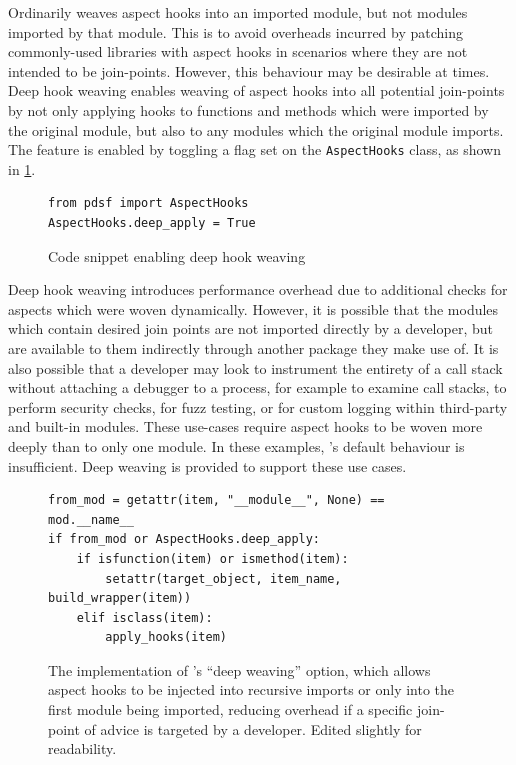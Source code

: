 Ordinarily \pdsf weaves aspect hooks into an imported module, but not modules
imported by that module. This is to avoid overheads incurred by patching
commonly-used libraries with aspect hooks in scenarios where they are not
intended to be join-points. However, this behaviour may be desirable at times.
Deep hook weaving enables weaving of aspect hooks into all potential join-points
by not only applying hooks to functions and methods which were imported by the
original module, but also to any modules which the original module imports. The
feature is enabled by toggling a flag set on the \lstinline{AspectHooks} class,
as shown in \cref{fig:enabling_deep_apply}.

\begin{figure}[h]
    \begin{lstlisting}[style=footnotesize_python]
from pdsf import AspectHooks
AspectHooks.deep_apply = True
    \end{lstlisting}
    \caption{Code snippet enabling deep hook weaving}
    \label{fig:enabling_deep_apply}
\end{figure}

Deep hook weaving introduces performance overhead due to additional checks for
aspects which were woven dynamically. However, it is possible that the modules
which contain desired join points are not imported directly by a developer, but
are available to them indirectly through another package they make use of. It is
also possible that a developer may look to instrument the entirety of a call
stack without attaching a debugger to a process, for example to examine call
stacks, to perform security checks, for fuzz testing, or for custom logging
within third-party and built-in modules. These use-cases require aspect hooks to
be woven more deeply than to only one module. In these examples, \pdsf{}'s
default behaviour is insufficient. Deep weaving is provided to support these use
cases.

\begin{figure}
    \begin{lstlisting}[style=footnotesize_python]
from_mod = getattr(item, "__module__", None) == mod.__name__
if from_mod or AspectHooks.deep_apply:
    if isfunction(item) or ismethod(item):
        setattr(target_object, item_name, build_wrapper(item))
    elif isclass(item):
        apply_hooks(item)
    \end{lstlisting}
    \caption{The implementation of \pdsf{}'s ``deep weaving'' option, which
    allows aspect hooks to be injected into recursive imports or only into the
    first module being imported, reducing overhead if a specific join-point of
    advice is targeted by a developer. Edited slightly for readability.}
    \label{fig:deep_weaving_optimisation_implementation}
\end{figure}

